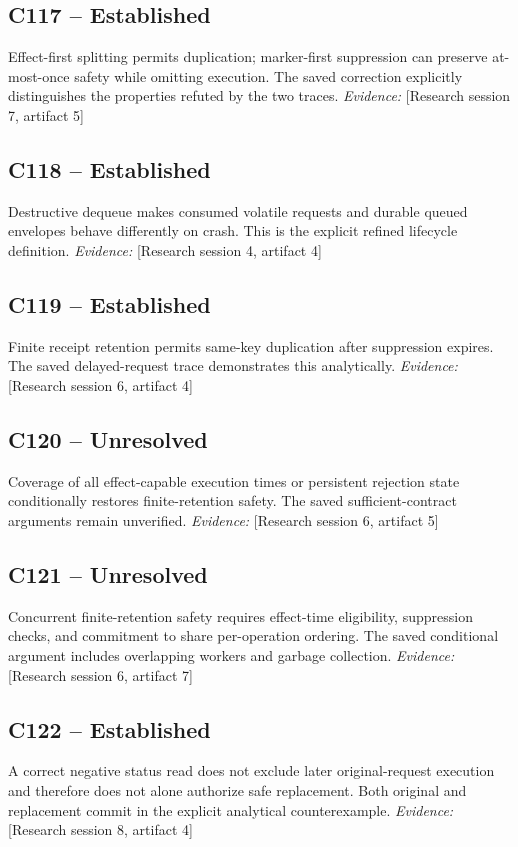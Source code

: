 \documentclass[11pt]{article}
\begin{document}
\begin{sloppypar}
\subsection{C117 -- Established}
Effect-first splitting permits duplication; marker-first suppression can preserve at-most-once safety while omitting execution.
The saved correction explicitly distinguishes the properties refuted by the two traces.
\textit{Evidence: }[Research session 7, artifact 5]
\subsection{C118 -- Established}
Destructive dequeue makes consumed volatile requests and durable queued envelopes behave differently on crash.
This is the explicit refined lifecycle definition.
\textit{Evidence: }[Research session 4, artifact 4]
\subsection{C119 -- Established}
Finite receipt retention permits same-key duplication after suppression expires.
The saved delayed-request trace demonstrates this analytically.
\textit{Evidence: }[Research session 6, artifact 4]
\subsection{C120 -- Unresolved}
Coverage of all effect-capable execution times or persistent rejection state conditionally restores finite-retention safety.
The saved sufficient-contract arguments remain unverified.
\textit{Evidence: }[Research session 6, artifact 5]
\subsection{C121 -- Unresolved}
Concurrent finite-retention safety requires effect-time eligibility, suppression checks, and commitment to share per-operation ordering.
The saved conditional argument includes overlapping workers and garbage collection.
\textit{Evidence: }[Research session 6, artifact 7]
\subsection{C122 -- Established}
A correct negative status read does not exclude later original-request execution and therefore does not alone authorize safe replacement.
Both original and replacement commit in the explicit analytical counterexample.
\textit{Evidence: }[Research session 8, artifact 4]

\end{sloppypar}
\end{document}
